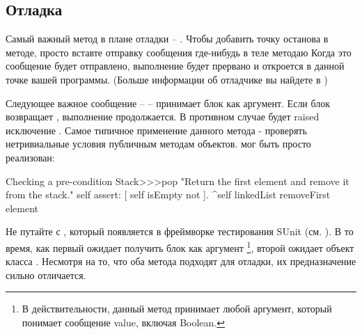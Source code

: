 \documentclass[a4paper,10pt,twoside]{book}
\begin{document}
\subsection{Отладка}

Самый важный метод в плане отладки -- . Чтобы добавить точку останова в методе, просто вставте отправку сообщения  где-нибудь в теле методаю Когда это сообщение будет отправлено, выполнение будет прервано и  откроется в данной точке вашей программы.
(Больше информации об отладчике вы найдете в )


Следующее важное сообщение --  -- принимает блок как аргумент. Если блок возвращает , выполнение продолжается. В противном случае будет raised исключение . Самое типичное применение данного метода - проверять нетривиальные условия публичным методам объектов.  мог быть просто реализован:

\begin{method}{Checking a pre-condition}
Stack>>>pop
    "Return the first element and remove it from the stack."
    self assert: [ self isEmpty not ].
    ^self linkedList removeFirst element
\end{method}

Не путайте  с , который появляется в фреймворке тестирования SUnit (см. ). В то время, как первый ожидает получить блок как аргумент \footnote{В действительности, данный метод принимает любой аргумент, который понимает сообщение value, включая Boolean.}, второй ожидает объект класса . Несмотря на то, что оба метода подходят для отладки, их предназначение сильно отличается.
\end{document}
